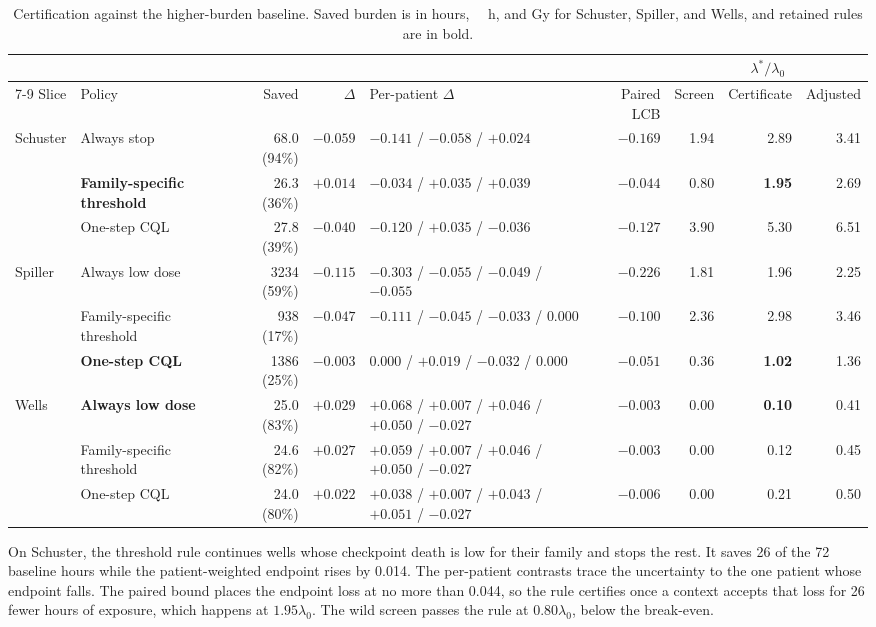 \documentclass[conference]{IEEEtran}
\begin{document}
\begin{table}[t]
\caption{Certification against the higher-burden baseline. Saved burden is in hours, \si{\micro\molar\hour}, and Gy for Schuster, Spiller, and Wells, and retained rules are in bold.}
\label{tab:cert}
\centering
\footnotesize
\setlength{\tabcolsep}{3pt}
\begin{tabular*}{\textwidth}{@{\extracolsep{\fill}}llrrlrrrr@{}}
\toprule
 & & & & & & \multicolumn{3}{c}{\(\lambda^\ast/\lambda_0\)} \\
\cmidrule(l){7-9}
Slice & Policy & Saved & \(\Delta\) & Per-patient \(\Delta\) & Paired LCB & Screen & Certificate & Adjusted \\
\midrule
Schuster & Always stop & 68.0 (94\%) & \(-0.059\) & \(-0.141\) / \(-0.058\) / \(+0.024\) & \(-0.169\) & 1.94 & 2.89 & 3.41 \\
 & \textbf{Family-specific threshold} & 26.3 (36\%) & \(+0.014\) & \(-0.034\) / \(+0.035\) / \(+0.039\) & \(-0.044\) & 0.80 & \textbf{1.95} & 2.69 \\
 & One-step CQL & 27.8 (39\%) & \(-0.040\) & \(-0.120\) / \(+0.035\) / \(-0.036\) & \(-0.127\) & 3.90 & 5.30 & 6.51 \\
\midrule
Spiller & Always low dose & 3234 (59\%) & \(-0.115\) & \(-0.303\) / \(-0.055\) / \(-0.049\) / \(-0.055\) & \(-0.226\) & 1.81 & 1.96 & 2.25 \\
 & Family-specific threshold & 938 (17\%) & \(-0.047\) & \(-0.111\) / \(-0.045\) / \(-0.033\) / \(0.000\) & \(-0.100\) & 2.36 & 2.98 & 3.46 \\
 & \textbf{One-step CQL} & 1386 (25\%) & \(-0.003\) & \(0.000\) / \(+0.019\) / \(-0.032\) / \(0.000\) & \(-0.051\) & 0.36 & \textbf{1.02} & 1.36 \\
\midrule
Wells & \textbf{Always low dose} & 25.0 (83\%) & \(+0.029\) & \(+0.068\) / \(+0.007\) / \(+0.046\) / \(+0.050\) / \(-0.027\) & \(-0.003\) & 0.00 & \textbf{0.10} & 0.41 \\
 & Family-specific threshold & 24.6 (82\%) & \(+0.027\) & \(+0.059\) / \(+0.007\) / \(+0.046\) / \(+0.050\) / \(-0.027\) & \(-0.003\) & 0.00 & 0.12 & 0.45 \\
 & One-step CQL & 24.0 (80\%) & \(+0.022\) & \(+0.038\) / \(+0.007\) / \(+0.043\) / \(+0.051\) / \(-0.027\) & \(-0.006\) & 0.00 & 0.21 & 0.50 \\
\bottomrule
\end{tabular*}
\end{table}

On Schuster, the threshold rule continues wells whose checkpoint death is low for their family and stops the rest. It saves 26 of the 72 baseline hours while the patient-weighted endpoint rises by 0.014. The per-patient contrasts trace the uncertainty to the one patient whose endpoint falls. The paired bound places the endpoint loss at no more than 0.044, so the rule certifies once a context accepts that loss for 26 fewer hours of exposure, which happens at \(1.95\lambda_0\). The wild screen passes the rule at \(0.80\lambda_0\), below the break-even.
\end{document}
